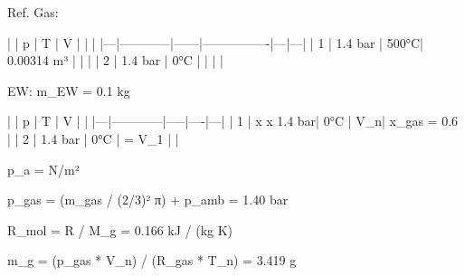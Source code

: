Ref. Gas:

|   | p          | T    | V              |   |   |
|---|------------|------|----------------|---|---|
| 1 | 1.4 bar    | 500°C| 0.00314 m³     |   |   |
| 2 | 1.4 bar    | 0°C  |                |   |   |

EW: m_EW = 0.1 kg

|   | p          | T   | V  |   |
|---|------------|-----|----|---|
| 1 | x x 1.4 bar| 0°C | V_n| x_gas = 0.6 |
| 2 | 1.4 bar    | 0°C | = V_1 |   |

p_a = N/m²

p_gas = (m_gas / (2/3)² π) + p_amb = 1.40 bar

R_mol = R / M_g = 0.166 kJ / (kg K)

m_g = (p_gas * V_n) / (R_gas * T_n) = 3.419 g